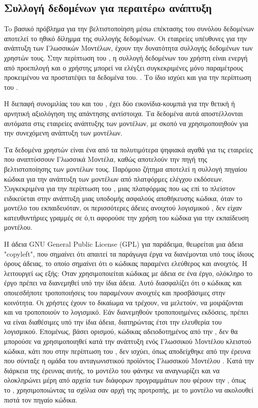 \subsection{Συλλογή δεδομένων για περαιτέρω ανάπτυξη}
To βασικό πρόβλημα για την βελτιστοποίηση μέσω επέκτασης του συνόλου
δεδομένων αποτελεί το ηθικό δίλημμα της
συλλογής δεδομένων. Οι εταιρείες υπέυθυνες για την ανάπτυξη των
Γλωσσικών Μοντέλων, έχουν την δυνατότητα συλλογής δεδομένων των
χρηστών τους. Στην περίπτωση του , η συλλογή
δεδομένων του χρήστη είναι ενεργή από προεπιλογή και ο χρήστης μπορεί
να ελέγξει συγκεκριμένες μόνο παραμέτρους προκειμένου να προστατέψει
τα δεδομένα του. \cite{ghcpdatacollection}. Το ίδιο ισχύει και για
την περίπτωση του  \cite{openaidatacollection}.

Η διεπαφή συνομιλίας του  και του , έχει δύο εικονίδια-κουμπιά
για την θετική ή αρνητική αξιολόγηση της απάντησης αντίστοιχα. Τα δεδομένα αυτά αποστέλλονται αυτόματα στις
εταιρείες ανάπτυξης των μοντέλων, με σκοπό να χρησιμοποιηθούν για την συνεχόμενη ανάπτυξη των μοντέλων.

Tα δεδομένα χρηστών είναι ένα από τα πολυτιμότερα ψηφιακά αγαθά για
τις εταιρείες που αναπτύσσουν Γλωσσικά Μοντέλα, καθώς αποτελούν την
πηγή της βελτιστοποίησης των μοντέλων τους. Παρόμοιο ζήτημα αποτελεί
η συλλογή πηγαίου κώδικα για την ανάπτυξη των μοντέλων από πλατφόρμες
ελέγχου εκδόσεων. Συγκεκριμένα για την περίπτωση του ,
μιας πλατφόρμας που ως επί το πλείστον ειδικεύεται στην ανάπτυξη μιας
υποδομής ασφαλούς αποθήκευσης κώδικα, όταν το μοντέλο του  εκπαιδευόταν,
οι περισσότερες άδειες ανοιχτού λογισμικού
\cite{freesoftwaredef,ossdef,debian}, δεν είχαν κατευθυντήριες
γραμμές σε ό,τι αφορούσε την χρήση του κώδικα για την εκπαίδευση
μοντέλου.

Η άδεια \textlatin{GNU General Public License (GPL)} για παράδειμα,
θεωρείται μια άδεια \textlatin{"copyleft"}, που σημαίνει ότι απαιτεί
τα παράγωγα έργα να διανέμονται υπό τους ίδιους όρους άδειας, το
οποίο σημαίνει ότι ο κώδικας παραμένει ελεύθερος και ανοιχτός.
Η  λειτουργεί ως εξής: Όταν χρησιμοποιείται κώδικας με άδεια  σε
ένα έργο, ολόκληρο το έργο πρέπει να διανεμηθεί υπό την ίδια άδεια.
Αυτό διασφαλίζει ότι ο κώδικας και οποιεσδήποτε τροποποιήσεις του
παραμένουν ανοιχτές και προσβάσιμες στην κοινότητα. Οι χρήστες έχουν
το δικαίωμα να τρέχουν, να μελετούν, να μοιράζονται και να
τροποποιούν το λογισμικό. Εάν διανεμηθούν τροποποιημένες εκδόσεις,
πρέπει να είναι διαθέσιμες υπό την ίδια άδεια, διατηρώντας έτσι
την ελευθερία του λογισμικού. Eπομένως, βάσει ορισμού, κώδικας
αδειοδοτημένος από την , δεν θα μπορούσε να χρησιμοποιηθεί
κατά την ανάπτυξη ενός Γλωσσικού Μοντέλου κλειστού κώδικα, κάτι που
στην περίπτωση του , δεν ισχύει, όπως αποδείχθηκε
από την έρευνα που σύνταξε η ομάδα του ανταγωνιστικού προϊόντος
Γλωσσικού Μοντέλου  \cite{codeiumghcp,forbes2024codeium}.
Κατά την διάρκεια της έρευνας αυτής, το μοντέλο του  φάνηκε να
αναγνωρίζει και να ολοκληρώνει μέρη από αρχεία των διάφορων
προγραμμάτων που φέρουν την , όπως το ,
χρησιμοποιώντας τα σχόλια σαν αρχή της προτροπής, με το μοντέλο να
ακολουθεί πιστά τον πηγαίο κώδικα.

